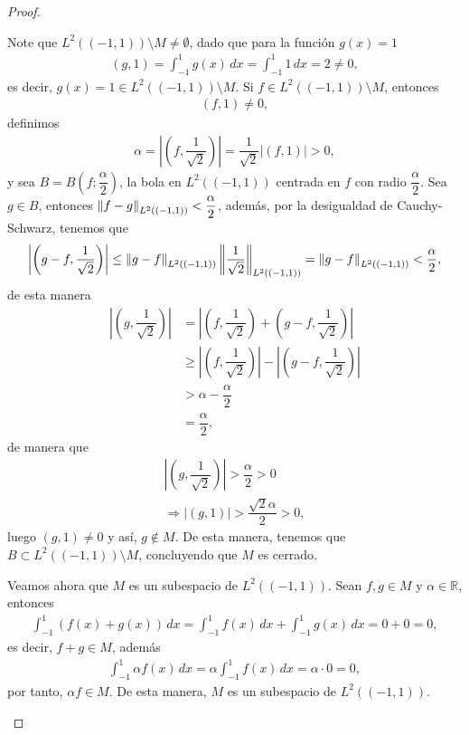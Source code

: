 \begin{proof}
\begin{enumerate}
\begin{enumerate}
        
        Note que $L^2((-1,1))\setminus M\neq \emptyset$, dado que para la función $g(x)=1$
        \begin{align*}
            (g,1)=\int_{-1}^1 g(x)\, dx=\int_{-1}^1 1 \, dx=2\neq 0,
        \end{align*}
        es decir, $g(x)=1\in L^2((-1,1))\setminus M$. Si $f \in L^2((-1,1))\setminus M$, entonces 
        \begin{align*}
            (f,1)\neq 0,
        \end{align*}
        definimos
        \begin{align*}
            \alpha=\left|\left(f,\dfrac{1}{\sqrt{2}}\right)\right|=\dfrac{1}{\sqrt{2}}|(f,1)|>0,
        \end{align*}
        y sea $B=B\left(f;\dfrac{\alpha}{2}\right)$, la bola en $L^2((-1,1))$ centrada en $f$ con radio $\dfrac{\alpha}{2}$. Sea \\
        $g \in B$, entonces $\left\|f-g\right\|_{L^2((-1,1))}<\dfrac{\alpha}{2}$, además, por la desigualdad de Cauchy-Schwarz, tenemos que 
        \begin{align*}
            \left|\left(g-f,\dfrac{1}{\sqrt{2}}\right)\right|\leq \left\|g-f\right\|_{L^2((-1,1))}\left\|\dfrac{1}{\sqrt{2}}\right\|_{L^2((-1,1))}=\left\|g-f\right\|_{L^2((-1,1))}<\dfrac{\alpha}{2},
        \end{align*}
        de esta manera
        \begin{align*}
            \left|\left(g,\dfrac{1}{\sqrt{2}}\right)\right|&=\left|\left(f,\dfrac{1}{\sqrt{2}}\right)+\left(g-f,\dfrac{1}{\sqrt{2}}\right)\right|\\
            &\geq \left|\left(f,\dfrac{1}{\sqrt{2}}\right)\right|-\left|\left(g-f,\dfrac{1}{\sqrt{2}}\right)\right|\\
            &>\alpha-\dfrac{\alpha}{2}\\
            &=\dfrac{\alpha}{2},
        \end{align*}
        de manera que 
        \begin{align*}
            \left|\left(g,\dfrac{1}{\sqrt{2}}\right)\right|>\dfrac{\alpha}{2}>0\\
            \Longrightarrow |(g,1)|>\dfrac{\sqrt{2}\alpha}{2}>0,
        \end{align*}
        luego $(g,1)\neq 0$ y así, $g \notin M$. De esta manera, tenemos que\\ $B\subset L^2((-1,1))\setminus M$, concluyendo que $M$ es cerrado. 

        Veamos ahora que $M$ es un subespacio de $L^2((-1,1))$. Sean $f,g \in M$ y $\alpha\in \mathbb{R}$, entonces
        \begin{align*}
            \int_{-1}^1 (f(x)+g(x))\, dx=\int_{-1}^1f(x)\, dx+\int_{-1}^1g(x)\, dx=0+0=0,
        \end{align*}
        es decir, $f+g\in M$, además
        \begin{align*}
            \int_{-1}^1\alpha f(x)\, dx=\alpha\int_{-1}^1 f(x)\, dx=\alpha\cdot 0=0,
        \end{align*}
        por tanto, $\alpha f\in M$. De esta manera, $M$ es un subespacio de $L^2((-1,1))$. 


\end{enumerate}
\end{enumerate}
\end{proof}
